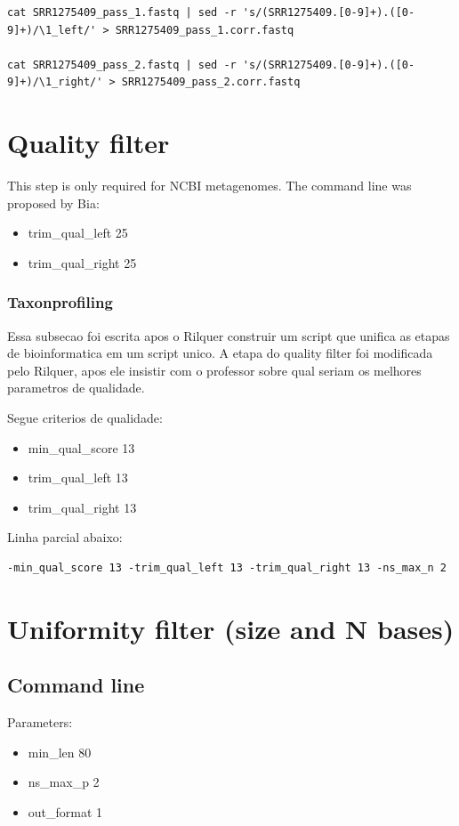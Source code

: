 \documentclass[12pt, a4paper]{report}
\begin{document}
\begin{lstlisting}[breaklines]
cat SRR1275409_pass_1.fastq | sed -r 's/(SRR1275409.[0-9]+).([0-9]+)/\1_left/' > SRR1275409_pass_1.corr.fastq

cat SRR1275409_pass_2.fastq | sed -r 's/(SRR1275409.[0-9]+).([0-9]+)/\1_right/' > SRR1275409_pass_2.corr.fastq
\end{lstlisting}

\chapter{Quality filter}
This step is only required for NCBI metagenomes. The command line was proposed by Bia:
\begin{itemize}
\item trim\_qual\_left 25
\item trim\_qual\_right 25
\end{itemize}

\subsection{Taxonprofiling}
Essa subsecao foi escrita apos o Rilquer construir um script que unifica as etapas de bioinformatica em um script unico.
A etapa do quality filter foi modificada pelo Rilquer, apos ele insistir com o professor sobre qual seriam os melhores parametros de qualidade. 

Segue criterios de qualidade:
\begin{itemize}
\item min\_qual\_score 13
\item trim\_qual\_left 13
\item trim\_qual\_right 13
\end{itemize}

Linha parcial abaixo: 

\begin{lstlisting}[breaklines]
-min_qual_score 13 -trim_qual_left 13 -trim_qual_right 13 -ns_max_n 2
\end{lstlisting}


\chapter{Uniformity filter (size and N bases)}
\section{Command line}
Parameters:
\begin{itemize}
\item min\_len 80 
\item ns\_max\_p 2 
\item out\_format 1
\end{itemize}
\end{document}
